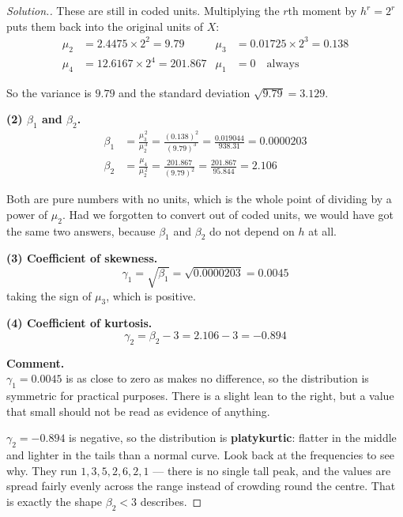 \documentclass[11pt,a4paper]{article}
\theoremstyle{definition}
\newenvironment{solution}
  {\renewcommand{\qedsymbol}{}\begin{proof}[\textit{Solution}.]}
  {\end{proof}}
\begin{document}
\begin{solution}
These are still in coded units. Multiplying the $r$th moment by $h^r=2^r$ puts them
back into the original units of $X$:
\begin{align*}
\mu_2 &=2.4475\times 2^2 =9.79 &
\mu_3 &=0.01725\times 2^3 =0.138\\
\mu_4 &=12.6167\times 2^4 =201.867 &
\mu_1 &=0 \quad\text{always}
\end{align*}

So the variance is $9.79$ and the standard deviation $\sqrt{9.79}=3.129$.

\textbf{(2) $\beta_1$ and $\beta_2$.}
\begin{align*}
\beta_1 &=\frac{\mu_3^{\,2}}{\mu_2^{\,3}}=\frac{(0.138)^2}{(9.79)^3}=\frac{0.019044}{938.31}=0.0000203\\
\beta_2 &=\frac{\mu_4}{\mu_2^{\,2}}=\frac{201.867}{(9.79)^2}=\frac{201.867}{95.844}=2.106
\end{align*}

Both are pure numbers with no units, which is the whole point of dividing by a power of
$\mu_2$. Had we forgotten to convert out of coded units, we would have got the same two
answers, because $\beta_1$ and $\beta_2$ do not depend on $h$ at all.

\textbf{(3) Coefficient of skewness.}
\[\gamma_1=\sqrt{\beta_1}=\sqrt{0.0000203}=0.0045\]
taking the sign of $\mu_3$, which is positive.

\textbf{(4) Coefficient of kurtosis.}
\[\gamma_2=\beta_2-3=2.106-3=-0.894\]

\textbf{Comment.}\\
$\gamma_1=0.0045$ is as close to zero as makes no difference, so the distribution is
symmetric for practical purposes. There is a slight lean to the right, but a value that
small should not be read as evidence of anything.

$\gamma_2=-0.894$ is negative, so the distribution is \textbf{platykurtic}: flatter in the
middle and lighter in the tails than a normal curve. Look back at the frequencies to see
why. They run $1,3,5,2,6,2,1$ --- there is no single tall peak, and the values are spread
fairly evenly across the range instead of crowding round the centre. That is exactly the
shape $\beta_2<3$ describes.
\end{solution}
\end{document}
